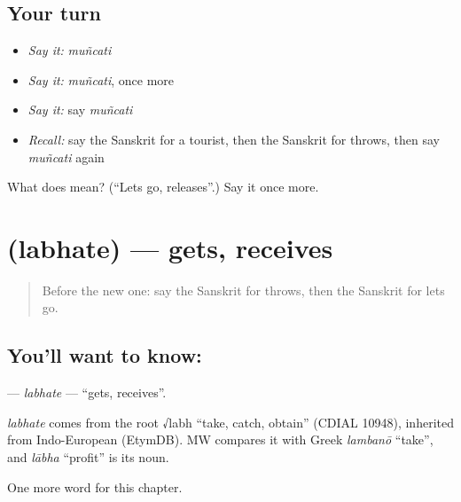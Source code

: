 \subsection*{Your turn}
\begin{itemize}
\raggedright
  \item \emph{Say it:} \emph{muñcati}
  \item \emph{Say it:} \emph{muñcati}, once more
  \item \emph{Say it:} say \emph{muñcati}
  \item \emph{Recall:} say the Sanskrit for a tourist, then the Sanskrit for throws, then say \emph{muñcati} again
\end{itemize}

\begin{tcolorbox}[breakable,colback=teal!4,colframe=teal!35!black,title={Before you move on}]
What does  mean? (\textquotedblleft{}Lets go, releases\textquotedblright{}.) Say it once more.
\end{tcolorbox}
\section[\texorpdfstring{\sk{लभते} (labhate)}{लभते (labhate)}]{ (labhate) — gets, receives}

\label{lesson:SA-C173-labhate}



\begin{quote}
Before the new one: say the Sanskrit for throws, then the Sanskrit for lets go.
\end{quote}

\subsection*{You'll want to know: }
\textbf{} — \emph{labhate} — \textquotedblleft{}gets, receives\textquotedblright{}.

\begin{cousinweb}
\emph{labhate} comes from the root √labh \textquotedblleft{}take, catch, obtain\textquotedblright{} (CDIAL 10948), inherited from Indo-European (EtymDB). MW compares it with Greek \emph{lambanō} \textquotedblleft{}take\textquotedblright{}, and \emph{lābha} \textquotedblleft{}profit\textquotedblright{} is its noun.
\end{cousinweb}

\begin{grammarlens}[title={What you've built}]
One more word for this chapter.
\end{grammarlens}

